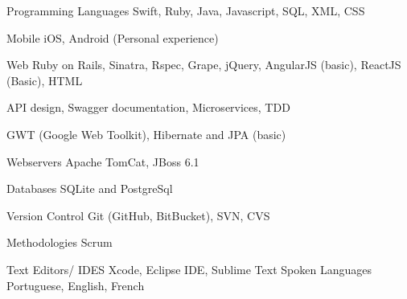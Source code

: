 

\begin{cvskills}
	
	\cvskill
	{Programming Languages} %
	{Swift, Ruby, Java, Javascript, SQL, XML, CSS} %
	
	\cvskill
	{Mobile} %
	{iOS, Android (Personal experience) } %
	
	\cvskill
	{Web} %
	{Ruby on Rails, Sinatra, Rspec, Grape, jQuery, AngularJS (basic), ReactJS (Basic), HTML}
	
	\cvskill
	{} %
	{API design, Swagger documentation, Microservices, TDD}
	
	\cvskill
	{} %
	{GWT (Google Web Toolkit), Hibernate and JPA (basic) }
	
	\cvskill
	{Webservers} %
	{Apache TomCat, JBoss 6.1} %
	
	\cvskill
	{Databases}
	{SQLite and PostgreSql}
	
	\cvskill
	{Version Control}
	{Git (GitHub, BitBucket), SVN, CVS}
	
	\cvskill
	{Methodologies}
	{Scrum}
	
	\cvskill
	{Text Editors/ IDES}
	{Xcode, Eclipse IDE, Sublime Text}
	\cvskill
	{Spoken Languages} %
	{Portuguese, English, French} %
	
\end{cvskills}
